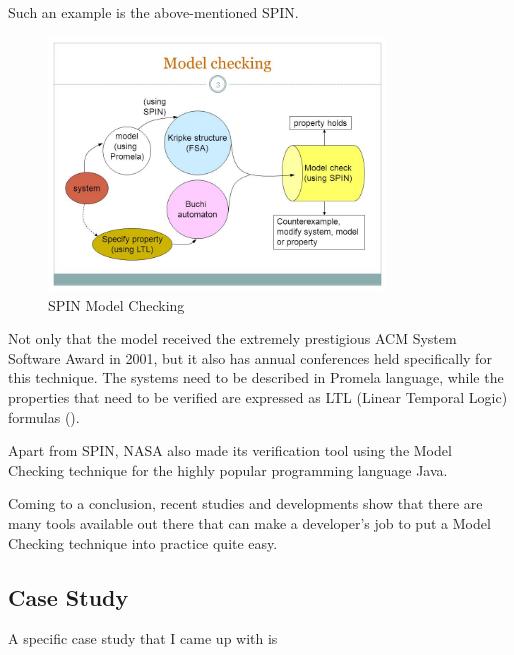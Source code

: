 \documentclass[paper=a4, fontsize=11pt]{scrartcl} %
\numberwithin{equation}{section} %
\numberwithin{figure}{section} %
\numberwithin{table}{section} %
\begin{document}
Such an example is the above-mentioned SPIN.

\begin{figure}[!ht]
    \centering
    \includegraphics[width=0.8\textwidth]{spin.jpg}
    \caption{SPIN Model Checking}
\end{figure}

Not only that the model received the extremely prestigious ACM System Software Award in 2001, but it also has annual conferences held specifically for this technique. The systems need to be described in Promela language, while the properties that need to be verified are expressed as LTL (Linear Temporal Logic) formulas (\cite{spin}). \\

\par 
Apart from SPIN, NASA also made its verification tool using the Model Checking technique for the highly popular programming language Java. \\

\par
Coming to a conclusion, recent studies and developments show that there are many tools available out there that can make a developer's job to put a Model Checking technique into practice quite easy.


\subsection{Case Study}

\par
A specific case study that I came up with is 

\end{document}
